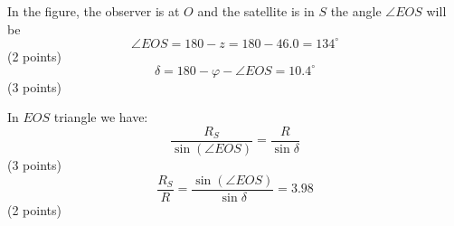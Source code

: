 In the figure, the observer is at $O$ and the satellite is in $S$ the angle
$\angle EOS$ will be
\[
  \angle EOS = 180 - z = 180 - 46.0 = 134^\circ
\]
\hfill(2 points)
\[
  \delta = 180 - \varphi - \angle EOS = 10.4^\circ
\]
\hfill(3 points)

In $EOS$ triangle we have:
\[
  \frac{R_S}{\sin(\angle EOS)} = \frac{R}{\sin\delta}
\]
\hfill(3 points)
\[
  \frac{R_S}{R} = \frac{\sin(\angle EOS)}{\sin\delta} = 3.98
\]
\hfill(2 points)
